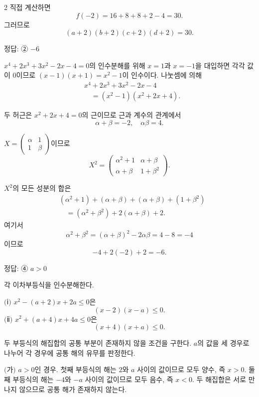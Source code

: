 \documentclass[10pt]{article}
\begin{document}
\begin{multicols}{2}
직접 계산하면
\[ f(-2) = 16 + 8 + 8 + 2 - 4 = 30. \]
그러므로
\[ (a+2)(b+2)(c+2)(d+2) = 30. \]

\begin{answerbox}정답: ② $-6$\end{answerbox}

$x^4 + 2x^3 + 3x^2 - 2x - 4 = 0$의 인수분해를 위해 $x = 1$과 $x = -1$을 대입하면 각각 값이 $0$이므로 $(x - 1)(x + 1) = x^2 - 1$이 인수이다. 나눗셈에 의해
\begin{align*}
&x^4 + 2x^3 + 3x^2 - 2x - 4 \\
&\quad = (x^2 - 1)(x^2 + 2x + 4).
\end{align*}

두 허근은 $x^2 + 2x + 4 = 0$의 근이므로 근과 계수의 관계에서
\[ \alpha + \beta = -2,\quad \alpha\beta = 4. \]

$X = \begin{pmatrix} \alpha & 1 \\ 1 & \beta \end{pmatrix}$이므로
\[ X^2 = \begin{pmatrix} \alpha^2 + 1 & \alpha + \beta \\ \alpha + \beta & 1 + \beta^2 \end{pmatrix}. \]

$X^2$의 모든 성분의 합은
\begin{align*}
&(\alpha^2 + 1) + (\alpha + \beta) + (\alpha + \beta) + (1 + \beta^2) \\
&\quad = (\alpha^2 + \beta^2) + 2(\alpha + \beta) + 2.
\end{align*}
여기서
\[ \alpha^2 + \beta^2 = (\alpha + \beta)^2 - 2\alpha\beta = 4 - 8 = -4 \]
이므로
\[ -4 + 2(-2) + 2 = -6. \]

\begin{answerbox}정답: ④ $a > 0$\end{answerbox}

각 이차부등식을 인수분해한다.

$(\!$ⅰ$)$ $x^2 - (a+2)x + 2a \le 0$은
\[ (x - 2)(x - a) \le 0. \]
$(\!$ⅱ$)$ $x^2 + (a+4)x + 4a \le 0$은
\[ (x + 4)(x + a) \le 0. \]

두 부등식의 해집합의 공통 부분이 존재하지 않을 조건을 구한다. $a$의 값을 세 경우로 나누어 각 경우에 공통 해의 유무를 판정한다.

$(\!$가$)$ $a > 0$인 경우. 첫째 부등식의 해는 $2$와 $a$ 사이의 값이므로 모두 양수, 즉 $x > 0$. 둘째 부등식의 해는 $-4$와 $-a$ 사이의 값이므로 모두 음수, 즉 $x < 0$. 두 해집합은 서로 만나지 않으므로 공통 해가 존재하지 않는다.


\end{multicols}
\end{document}
